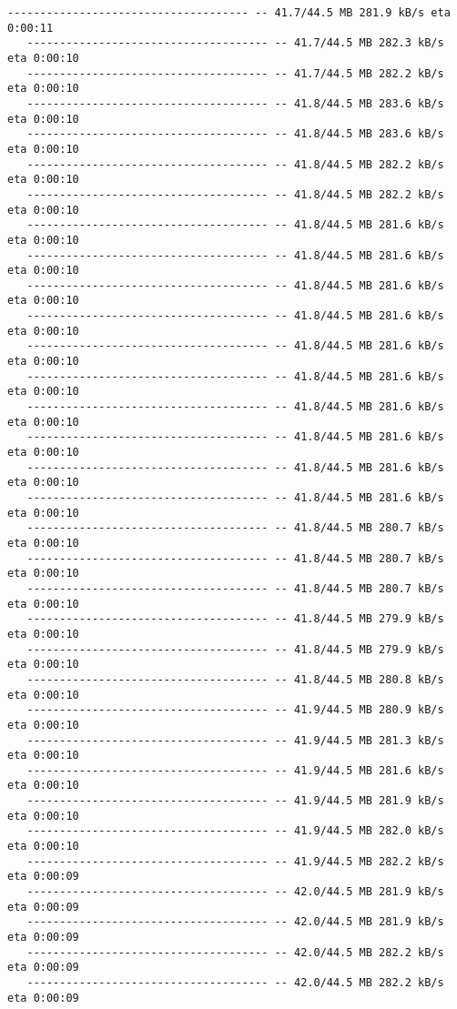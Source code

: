 \documentclass[11pt]{article}
\begin{document}
\begin{Verbatim}[commandchars=\\\{\}]
   ------------------------------------- -- 41.7/44.5 MB 281.9 kB/s eta 0:00:11
   ------------------------------------- -- 41.7/44.5 MB 282.3 kB/s eta 0:00:10
   ------------------------------------- -- 41.7/44.5 MB 282.2 kB/s eta 0:00:10
   ------------------------------------- -- 41.8/44.5 MB 283.6 kB/s eta 0:00:10
   ------------------------------------- -- 41.8/44.5 MB 283.6 kB/s eta 0:00:10
   ------------------------------------- -- 41.8/44.5 MB 282.2 kB/s eta 0:00:10
   ------------------------------------- -- 41.8/44.5 MB 282.2 kB/s eta 0:00:10
   ------------------------------------- -- 41.8/44.5 MB 281.6 kB/s eta 0:00:10
   ------------------------------------- -- 41.8/44.5 MB 281.6 kB/s eta 0:00:10
   ------------------------------------- -- 41.8/44.5 MB 281.6 kB/s eta 0:00:10
   ------------------------------------- -- 41.8/44.5 MB 281.6 kB/s eta 0:00:10
   ------------------------------------- -- 41.8/44.5 MB 281.6 kB/s eta 0:00:10
   ------------------------------------- -- 41.8/44.5 MB 281.6 kB/s eta 0:00:10
   ------------------------------------- -- 41.8/44.5 MB 281.6 kB/s eta 0:00:10
   ------------------------------------- -- 41.8/44.5 MB 281.6 kB/s eta 0:00:10
   ------------------------------------- -- 41.8/44.5 MB 281.6 kB/s eta 0:00:10
   ------------------------------------- -- 41.8/44.5 MB 281.6 kB/s eta 0:00:10
   ------------------------------------- -- 41.8/44.5 MB 280.7 kB/s eta 0:00:10
   ------------------------------------- -- 41.8/44.5 MB 280.7 kB/s eta 0:00:10
   ------------------------------------- -- 41.8/44.5 MB 280.7 kB/s eta 0:00:10
   ------------------------------------- -- 41.8/44.5 MB 279.9 kB/s eta 0:00:10
   ------------------------------------- -- 41.8/44.5 MB 279.9 kB/s eta 0:00:10
   ------------------------------------- -- 41.8/44.5 MB 280.8 kB/s eta 0:00:10
   ------------------------------------- -- 41.9/44.5 MB 280.9 kB/s eta 0:00:10
   ------------------------------------- -- 41.9/44.5 MB 281.3 kB/s eta 0:00:10
   ------------------------------------- -- 41.9/44.5 MB 281.6 kB/s eta 0:00:10
   ------------------------------------- -- 41.9/44.5 MB 281.9 kB/s eta 0:00:10
   ------------------------------------- -- 41.9/44.5 MB 282.0 kB/s eta 0:00:10
   ------------------------------------- -- 41.9/44.5 MB 282.2 kB/s eta 0:00:09
   ------------------------------------- -- 42.0/44.5 MB 281.9 kB/s eta 0:00:09
   ------------------------------------- -- 42.0/44.5 MB 281.9 kB/s eta 0:00:09
   ------------------------------------- -- 42.0/44.5 MB 282.2 kB/s eta 0:00:09
   ------------------------------------- -- 42.0/44.5 MB 282.2 kB/s eta 0:00:09

\end{Verbatim}
\end{document}
